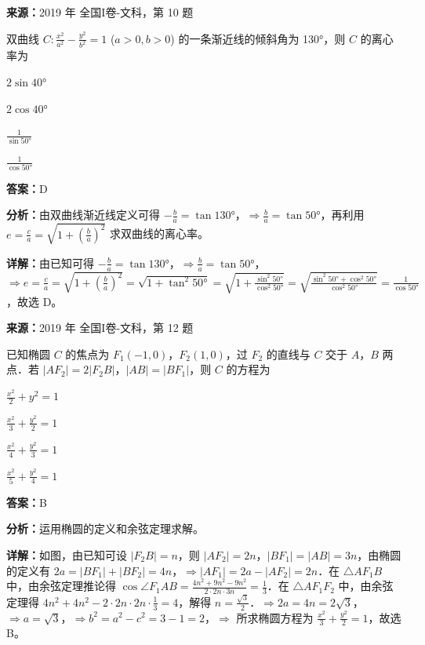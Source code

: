 \begin{question}[points=5]
\textbf{来源：}2019 年 全国I卷-文科，第 10 题\par
双曲线 $C: \frac{x^2}{a^2} - \frac{y^2}{b^2} = 1$ ($a>0,b>0$) 的一条渐近线的倾斜角为 130°，则 $C$ 的离心率为
\begin{choices}
  \item $2\sin40°$
  \item $2\cos40°$
  \item $\frac{1}{\sin50°}$
  \item $\frac{1}{\cos50°}$
\end{choices}
\begin{solution}
\textbf{答案：}D

\textbf{分析：}由双曲线渐近线定义可得 $-\frac{b}{a} = \tan130°$，$\Rightarrow \frac{b}{a} = \tan50°$，再利用 $e = \frac{c}{a} = \sqrt{1+\left(\frac{b}{a}\right)^2}$ 求双曲线的离心率。

\textbf{详解：}由已知可得 $-\frac{b}{a} = \tan130°$，$\Rightarrow \frac{b}{a} = \tan50°$，$\Rightarrow e = \frac{c}{a} = \sqrt{1+\left(\frac{b}{a}\right)^2} = \sqrt{1+\tan^2 50°} = \sqrt{1+\frac{\sin^2 50°}{\cos^2 50°}} = \sqrt{\frac{\sin^2 50°+\cos^2 50°}{\cos^2 50°}} = \frac{1}{\cos50°}$，故选 D。
\end{solution}
\end{question}

\begin{question}[points=5]
\textbf{来源：}2019 年 全国I卷-文科，第 12 题\par
已知椭圆 $C$ 的焦点为 $F_1(-1,0)$，$F_2(1,0)$，过 $F_2$ 的直线与 $C$ 交于 $A$，$B$ 两点．若 $|AF_2| = 2|F_2B|$，$|AB| = |BF_1|$，则 $C$ 的方程为
\begin{choices}
  \item $\frac{x^2}{2}+y^2=1$
  \item $\frac{x^2}{3}+\frac{y^2}{2}=1$
  \item $\frac{x^2}{4}+\frac{y^2}{3}=1$
  \item $\frac{x^2}{5}+\frac{y^2}{4}=1$
\end{choices}
\begin{solution}
\textbf{答案：}B

\textbf{分析：}运用椭圆的定义和余弦定理求解。

\textbf{详解：}如图，由已知可设 $|F_2B| = n$，则 $|AF_2| = 2n$，$|BF_1| = |AB| = 3n$，由椭圆的定义有 $2a = |BF_1|+|BF_2| = 4n$，$\Rightarrow |AF_1| = 2a - |AF_2| = 2n$．在 $\triangle AF_1B$ 中，由余弦定理推论得 $\cos\angle F_1AB = \frac{4n^2+9n^2-9n^2}{2\cdot 2n \cdot 3n} = \frac{1}{3}$．在 $\triangle AF_1F_2$ 中，由余弦定理得 $4n^2+4n^2-2\cdot 2n \cdot 2n \cdot \frac{1}{3} = 4$，解得 $n = \frac{\sqrt{3}}{2}$．$\Rightarrow 2a = 4n = 2\sqrt{3}$，$\Rightarrow a = \sqrt{3}$，$\Rightarrow b^2 = a^2 - c^2 = 3-1=2$，$\Rightarrow$ 所求椭圆方程为 $\frac{x^2}{3}+\frac{y^2}{2}=1$，故选 B。
\end{solution}
\end{question}

